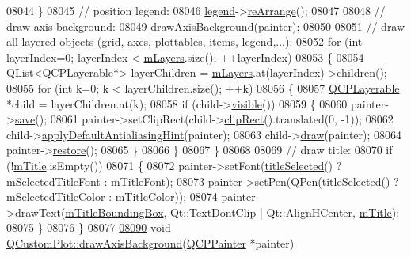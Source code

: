 \begin{DoxyCode}
08044   \}
08045   \textcolor{comment}{// position legend:}
08046   \hyperlink{a00116_a75acd427ec48e9a9d2ae6a17817cc490}{legend}->\hyperlink{a00045_ad7fd50e5478b0da477d9cc74b7204caf}{reArrange}();
08047   
08048   \textcolor{comment}{// draw axis background:}
08049   \hyperlink{a00116_a2ddc6669cdcd1224803f78e579858b16}{drawAxisBackground}(painter);
08050   
08051   \textcolor{comment}{// draw all layered objects (grid, axes, plottables, items, legend,...):}
08052   \textcolor{keywordflow}{for} (\textcolor{keywordtype}{int} layerIndex=0; layerIndex < \hyperlink{a00116_ae46b0ffefe1087007ffb11398a18a20e}{mLayers}.size(); ++layerIndex)
08053   \{
08054     QList<QCPLayerable*> layerChildren = \hyperlink{a00116_ae46b0ffefe1087007ffb11398a18a20e}{mLayers}.at(layerIndex)->children();
08055     \textcolor{keywordflow}{for} (\textcolor{keywordtype}{int} k=0; k < layerChildren.size(); ++k)
08056     \{
08057       \hyperlink{a00044}{QCPLayerable} *child = layerChildren.at(k);
08058       \textcolor{keywordflow}{if} (child->\hyperlink{a00044_a10a3cc92e0fa63e4a929e61d34e275a7}{visible}())
08059       \{
08060         painter->\hyperlink{a00047_a8fd6821ee6fecbfa04444c9062912abd}{save}();
08061         painter->setClipRect(child->\hyperlink{a00044_a07a8f746640c3704b09910df297afcba}{clipRect}().translated(0, -1));
08062         child->\hyperlink{a00044_afdf83ddc6a265cbf4c89fe99d3d93473}{applyDefaultAntialiasingHint}(painter);
08063         child->\hyperlink{a00044_aecf2f7087482d4b6a78cb2770e5ed12d}{draw}(painter);
08064         painter->\hyperlink{a00047_a64908e6298d5bbd83457dc987cc3a022}{restore}();
08065       \}
08066     \}
08067   \}
08068   
08069   \textcolor{comment}{// draw title:}
08070   \textcolor{keywordflow}{if} (!\hyperlink{a00116_a897f8f3962601be2f02346e99e1fd7fb}{mTitle}.isEmpty())
08071   \{
08072     painter->setFont(\hyperlink{a00116_a23f3f4b312d1d78837f2a3602792d8e3}{titleSelected}() ? \hyperlink{a00116_a0857efaeb16b387fd17d6423d234cec8}{mSelectedTitleFont} : mTitleFont);
08073     painter->\hyperlink{a00047_af9c7a4cd1791403901f8c5b82a150195}{setPen}(QPen(\hyperlink{a00116_a23f3f4b312d1d78837f2a3602792d8e3}{titleSelected}() ? 
      \hyperlink{a00116_a6b947daad117396a1b6f9d9fe90094d8}{mSelectedTitleColor} : \hyperlink{a00116_a56e768edac99110852bf82826da144b9}{mTitleColor}));
08074     painter->drawText(\hyperlink{a00116_ab64b411eef7fd9d890c871993116d289}{mTitleBoundingBox}, Qt::TextDontClip | Qt::AlignHCenter, 
      \hyperlink{a00116_a897f8f3962601be2f02346e99e1fd7fb}{mTitle});
08075   \}
08076 \}
08077 
\hypertarget{a00115_source_l08090}{}\hyperlink{a00116_a2ddc6669cdcd1224803f78e579858b16}{08090} \textcolor{keywordtype}{void} \hyperlink{a00116_a2ddc6669cdcd1224803f78e579858b16}{QCustomPlot::drawAxisBackground}(\hyperlink{a00047}{QCPPainter} *painter)

\end{DoxyCode}
